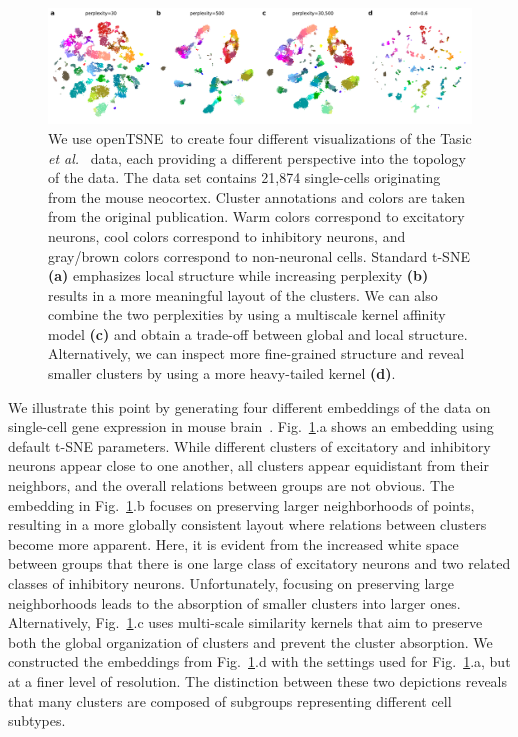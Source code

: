 \documentclass[twocolumn]{article}
\newcommand{\opentsne}{\textsf{openTSNE}}
\begin{document}
\begin{figure}[htbp]
	\includegraphics[width=\textwidth]{tasic2018}
	\caption{\label{fig:tasic}We use \opentsne\ to create four different
	visualizations of the Tasic \textit{et al.}~\cite{tasic2018shared} data,
	each providing a different perspective into the topology of the data.
	The data set contains 21,874 single-cells originating from the mouse
	neocortex. Cluster annotations and colors are taken from the original
	publication. Warm colors correspond to excitatory neurons, cool colors
	correspond to inhibitory neurons, and gray/brown colors correspond to
	non-neuronal cells. Standard t-SNE \textbf{(a)} emphasizes local
	structure while increasing perplexity \textbf{(b)} results in a more
	meaningful layout of the clusters. We can also combine the two
	perplexities by using a multiscale kernel affinity model \textbf{(c)}
	and obtain a trade-off between global and local structure.
	Alternatively, we can inspect more fine-grained structure and reveal
  smaller clusters by using a more heavy-tailed kernel \textbf{(d)}.}
\end{figure}

We illustrate this point by generating four different embeddings of the data on
single-cell gene expression in mouse brain~\cite{tasic2018shared}.
Fig.~\ref{fig:tasic}.a shows an embedding using default t-SNE parameters. While
different clusters of excitatory and inhibitory neurons appear close to one
another, all clusters appear equidistant from their neighbors, and the overall
relations between groups are not obvious. The embedding in Fig.~\ref{fig:tasic}.b
focuses on preserving larger neighborhoods of points, resulting in a more
globally consistent layout where relations between clusters become more
apparent. Here, it is evident from the increased white space between groups that
there is one large class of excitatory neurons and two related classes of
inhibitory neurons. Unfortunately, focusing on preserving large neighborhoods
leads to the absorption of smaller clusters into larger ones. Alternatively,
Fig.~\ref{fig:tasic}.c uses multi-scale similarity kernels that aim to preserve
both the global organization of clusters and prevent the cluster absorption. We
constructed the embeddings from Fig.~\ref{fig:tasic}.d with the settings used
for Fig.~\ref{fig:tasic}.a, but at a finer level of resolution. The distinction
between these two depictions reveals that many clusters are composed of
subgroups representing different cell subtypes.
\end{document}
